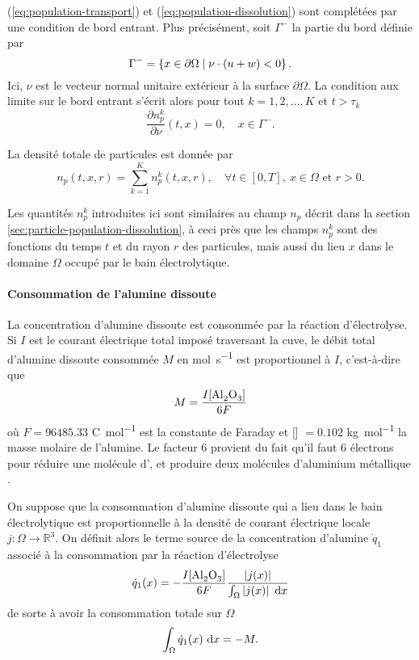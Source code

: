 (\ref{eq:population-transport}) et (\ref{eq:population-dissolution})
sont complétées par une condition de bord entrant. Plus
précisément, soit $\Gamma^-$ la partie du bord
définie par
\begin{equation}\label{eq:np-bc}
  \Gamma^- = \left\{ x\in\partial\Omega \mid \nu \cdot \left( u + w \right)
  < 0 \right\}.
\end{equation}
Ici, $\nu$ est le vecteur normal unitaire extérieur à la surface
$\partial \Omega$. La condition aux limite sur le bord entrant s'écrit
alors pour tout $k = 1, 2, \dots, K$ et $t > \tau_k$
\begin{equation}
\frac{\partial n_p^k}{\partial \nu}(t, x) = 0, \quad x\in\Gamma^-.
\end{equation}

La densité totale de particules est donnée par
\begin{equation}
  n_p(t, x, r) = \sum_{k=1}^K n_p^k(t, x, r), \quad \forall t\in[0,
    T],\ x \in \Omega\text{ et } r > 0.
\end{equation}

\begin{remarque}
Les quantités $n_p^k$ introduites ici sont similaires au champ $n_p$
décrit dans la section \ref{sec:particle-population-dissolution}, à
ceci près que les champs $n_p^k$ sont des fonctions du temps $t$ et du
rayon $r$ des particules, mais aussi du lieu $x$ dans le domaine
$\Omega$ occupé par le bain électrolytique.
\end{remarque}

\paragraph{Consommation de l'alumine dissoute}
La concentration d'alumine dissoute est consommée par la réaction
d'électrolyse. Si $I$ est le courant électrique total imposé
traversant la cuve, le débit total d'alumine dissoute consommée $M$ en
\si{\mol\per\second} est proportionnel à $I$, c'est-à-dire que
\begin{equation}
  M = \frac{I[\ce{Al2O3}]}{6\faraday}
\end{equation}
où $F = \num{96485.33}$ \si{\coulomb\per\mol} est la constante de
Faraday et [] $ = \num{0.102}$ \si{\kilo\gram\per\mol} la
masse molaire de l'alumine. Le facteur \num{6} provient du fait qu'il
faut \num{6} électrons pour réduire une molécule d', et
produire deux molécules d'aluminium métallique .

On suppose que la consommation d'alumine dissoute qui a lieu dans le
bain électrolytique est proportionnelle à la densité de courant
électrique locale $j:\Omega\to\mathbb R^3$. On définit alors le terme
source de la concentration d'alumine $\dot q_1$ associé à la
consommation par la réaction d'électrolyse
\begin{equation}
  \dot q_1(x) = -\frac{I[\ce{Al2O3}]}{6\faraday} %
  \frac{\abs{j(x)}}{\int_\Omega\abs{j(x)}\,\intd{x}}
\end{equation}
de sorte à avoir la consommation totale sur $\Omega$
\begin{equation}
  \int_\Omega \dot q_1(x)\,\,\mathrm dx = -M.
\end{equation}

